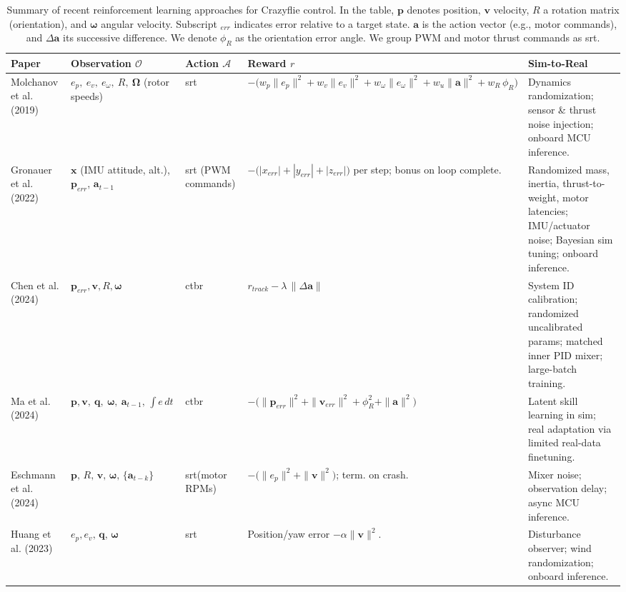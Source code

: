 \begin{table*}[!b]
  \centering
  \caption[Summary of RL approaches]{Summary of recent reinforcement learning approaches for Crazyflie control. In the table, $\mathbf{p}$ denotes position, $\mathbf{v}$ velocity, $R$ a rotation matrix (orientation), and $\boldsymbol{\omega}$ angular velocity. Subscript $_{err}$ indicates error relative to a target state. $\mathbf{a}$ is the action vector (e.g., motor commands), and $\Delta \mathbf{a}$ its successive difference. We denote $\phi_R$ as the orientation error angle. We group PWM and motor thrust commands as \gls{srt}.}
  \label{tab:rl_comparison}
  \scriptsize
  \begin{tabularx}{\textwidth}{p{2.0cm} p{3.0cm} p{1.5cm} p{3.5cm} X}
    \toprule
    \rowcolor{white}
    \textbf{Paper} & \textbf{Observation $\mathcal{O}$} & \textbf{Action $\mathcal{A}$} & \textbf{Reward $r$} & \textbf{Sim-to-Real} \\
    \midrule
    Molchanov et al. (2019)~\cite{molchanov_sim--multi-real_2019} & $e_p,\ e_v,\ e_\omega,\ R,\ \boldsymbol{\Omega}$ (rotor speeds) & \gls{srt} & $-\bigl(w_p\|e_p\|^2 + w_v\|e_v\|^2 + w_\omega\|e_\omega\|^2 + w_u\|\mathbf{a}\|^2 + w_R\,\phi_R\bigr)$ & Dynamics randomization; sensor \& thrust noise injection; onboard MCU inference. \\
    Gronauer et al. (2022)~\cite{gronauer_using_2022} & $\mathbf{x}$ (IMU attitude, alt.), $\mathbf{p}_{err}$, $\mathbf{a}_{t-1}$ & \gls{srt} (PWM commands) & $-\bigl(|x_{err}|+|y_{err}|+|z_{err}|\bigr)$ per step; bonus on loop complete. & Randomized mass, inertia, thrust-to-weight, motor latencies; IMU/actuator noise; Bayesian sim tuning; onboard inference. \\
    Chen et al. (2024)~\cite{chen_what_2024} & $\mathbf{p}_{err}, \mathbf{v}, R, \boldsymbol{\omega}$ & \gls{ctbr} & $r_{track} - \lambda\,\|\Delta\mathbf{a}\|$ & System ID calibration; randomized uncalibrated params; matched inner PID mixer; large-batch training. \\
    Ma et al. (2024)~\cite{ma2024skilltransfer} & $\mathbf{p},\mathbf{v},\ \mathbf{q},\ \boldsymbol{\omega},\ \mathbf{a}_{t-1},\,\int e\,dt$ & \gls{ctbr} & $-\bigl(\|\mathbf{p}_{err}\|^2+\|\mathbf{v}_{err}\|^2+\phi_R^2+\|\mathbf{a}\|^2\bigr)$ & Latent skill learning in sim; real adaptation via limited real-data finetuning. \\
    Eschmann et al. (2024)~\cite{eschmann_learning_2024} & $\mathbf{p},\,R,\,\mathbf{v},\,\boldsymbol{\omega},\,\{\mathbf{a}_{t-k}\}$ & \gls{srt}(motor RPMs) & $-\bigl(\|e_p\|^2 + \|\mathbf{v}\|^2\bigr)$; term. on crash. & Mixer noise; observation delay; async MCU inference. \\
    Huang et al. (2023)~\cite{huang_quadswarm_2023} & $e_p,e_v,\,\mathbf{q},\,\boldsymbol{\omega}$ & \gls{srt} & Position/yaw error $- \alpha\|\mathbf{v}\|^2$. & Disturbance observer; wind randomization; onboard inference. \\
    \bottomrule
  \end{tabularx}
\end{table*}

